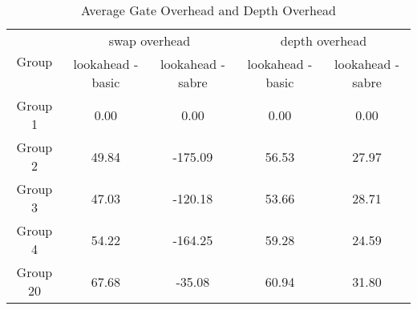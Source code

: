 \begin{table}[htb]
\centering
\caption{Average Gate Overhead and Depth Overhead}
\label{tab:table-average-overhead}
\begin{tabular}{|c|c|c|c|c|} 
\hline
\multirow{2}{*}{Group} & \multicolumn{2}{c|}{swap overhead}    & \multicolumn{2}{c|}{depth overhead}    \\ 
\cline{2-5}
                       & lookahead - basic & lookahead - sabre & lookahead - basic & lookahead - sabre  \\ 
\hline
Group 1                & 0.00              & 0.00              & 0.00              & 0.00               \\ 
\hline
Group 2                & 49.84             & -175.09           & 56.53             & 27.97              \\ 
\hline
Group 3                & 47.03             & -120.18           & 53.66             & 28.71              \\ 
\hline
Group 4                & 54.22             & -164.25           & 59.28             & 24.59              \\ 
\hline
Group 20               & 67.68             & -35.08            & 60.94             & 31.80              \\
\hline
\end{tabular}
\end{table}